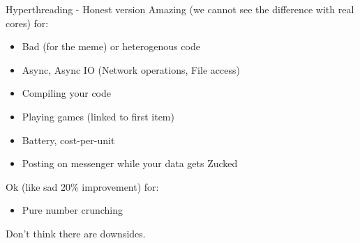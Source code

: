 \begin{frame}{Hyperthreading - Honest version}
    Amazing (we cannot see the difference with real cores) for:
    \begin{itemize}
        \item Bad (for the meme) or heterogenous code
        \item Async, Async IO (Network operations, File access)
        \item Compiling your code
        \item Playing games (linked to first item)
        \item Battery, cost-per-unit
        \item Posting on messenger while your data gets Zucked
    \end{itemize}
    Ok (like sad 20\% improvement) for:
    \begin{itemize}
        \item Pure number crunching
    \end{itemize}
    Don't think there are downsides.
\end{frame}



